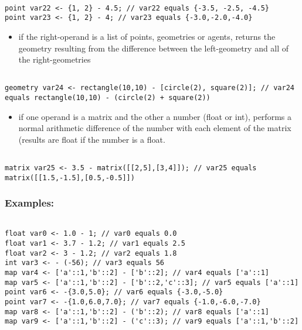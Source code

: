 \documentclass[]{book}
\providecommand{\tightlist}{%
  \setlength{\itemsep}{0pt}\setlength{\parskip}{0pt}}
\theoremstyle{definition}
\theoremstyle{definition}
\theoremstyle{definition}
\theoremstyle{remark}
\begin{document}
\begin{verbatim}
 
point var22 <- {1, 2} - 4.5; // var22 equals {-3.5, -2.5, -4.5} 
point var23 <- {1, 2} - 4; // var23 equals {-3.0,-2.0,-4.0}
\end{verbatim}

\begin{itemize}
\tightlist
\item
  if the right-operand is a list of points, geometries or agents,
  returns the geometry resulting from the difference between the
  left-geometry and all of the right-geometries
\end{itemize}

\begin{verbatim}
 
geometry var24 <- rectangle(10,10) - [circle(2), square(2)]; // var24 equals rectangle(10,10) - (circle(2) + square(2))
\end{verbatim}

\begin{itemize}
\tightlist
\item
  if one operand is a matrix and the other a number (float or int),
  performs a normal arithmetic difference of the number with each
  element of the matrix (results are float if the number is a float.
\end{itemize}

\begin{verbatim}
 
matrix var25 <- 3.5 - matrix([[2,5],[3,4]]); // var25 equals matrix([[1.5,-1.5],[0.5,-0.5]])
\end{verbatim}

\subsubsection{Examples:}\label{examples}

\begin{verbatim}
 
float var0 <- 1.0 - 1; // var0 equals 0.0 
float var1 <- 3.7 - 1.2; // var1 equals 2.5 
float var2 <- 3 - 1.2; // var2 equals 1.8 
int var3 <- - (-56); // var3 equals 56 
map var4 <- ['a'::1,'b'::2] - ['b'::2]; // var4 equals ['a'::1] 
map var5 <- ['a'::1,'b'::2] - ['b'::2,'c'::3]; // var5 equals ['a'::1] 
point var6 <- -{3.0,5.0}; // var6 equals {-3.0,-5.0} 
point var7 <- -{1.0,6.0,7.0}; // var7 equals {-1.0,-6.0,-7.0} 
map var8 <- ['a'::1,'b'::2] - ('b'::2); // var8 equals ['a'::1] 
map var9 <- ['a'::1,'b'::2] - ('c'::3); // var9 equals ['a'::1,'b'::2]
\end{verbatim}
\end{document}
